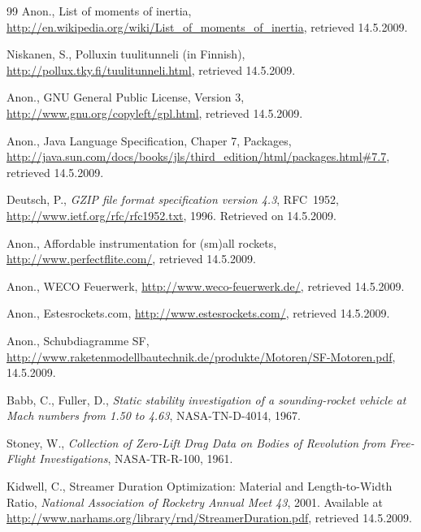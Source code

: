 \documentclass[a4paper,12pt,oneside]{book}
\begin{document}
\begin{thebibliography}{99}
 Anon., List of moments of inertia,
  \url{http://en.wikipedia.org/wiki/List_of_moments_of_inertia},
  retrieved 14.5.2009.

 Niskanen, S., Polluxin tuulitunneli (in
  Finnish), \url{http://pollux.tky.fi/tuulitunneli.html}, retrieved 14.5.2009.

 Anon., GNU General Public License, Version 3,
  \url{http://www.gnu.org/copyleft/gpl.html}, retrieved 14.5.2009.

 Anon., Java Language Specification, Chaper 7,
  Packages,
 \url{http://java.sun.com/docs/books/jls/third_edition/html/packages.html#7.7},
  retrieved 14.5.2009.

 Deutsch, P., {\it GZIP file format specification
  version 4.3}, RFC~1952, \url{http://www.ietf.org/rfc/rfc1952.txt},
  1996.  Retrieved on 14.5.2009.

 Anon., Affordable instrumentation for (sm)all
  rockets, \url{http://www.perfectflite.com/}, retrieved 14.5.2009.

 Anon., WECO Feuerwerk,
  \url{http://www.weco-feuerwerk.de/}, retrieved 14.5.2009.

 Anon., Estesrockets.com,
  \url{http://www.estesrockets.com/}, retrieved 14.5.2009.

 Anon., Schubdiagramme SF,
  \url{http://www.raketenmodellbautechnik.de/produkte/Motoren/SF-Motoren.pdf},
  14.5.2009.

 Babb, C., Fuller, D., {\it Static
  stability investigation of a sounding-rocket vehicle at Mach numbers
  from 1.50 to 4.63}, NASA-TN-D-4014, 1967.

 Stoney, W., {\it Collection of Zero-Lift
  Drag Data on Bodies of Revolution from Free-Flight Investigations}, 
  NASA-TR-R-100, 1961.

 Kidwell, C., Streamer Duration
  Optimization: Material and Length-to-Width Ratio, {\it National
  Association of Rocketry Annual Meet 43}, 2001.  Available at
  \url{http://www.narhams.org/library/rnd/StreamerDuration.pdf},
  retrieved 14.5.2009.

\end{thebibliography}




\appendix


\end{document}
